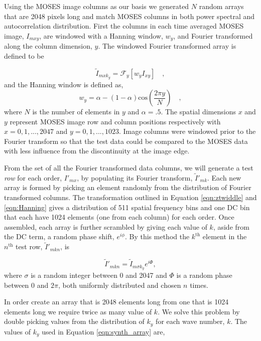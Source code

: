 		Using the MOSES image columns as our basis we generated $N$ random arrays that are 2048 pixels long and match MOSES columns in both power spectral and autocorrelation distribution.  
		First the columns in each time averaged MOSES image, $I_{mxy}$, are windowed with a Hanning window, $w_y$, and Fourier transformed along the column dimension, $y$.  
		The windowed Fourier transformed array is defined to be
	
		\begin{equation}
			\widetilde{I}_{mxk_y} = \mathcal{F}_y\left[ w_yI_{xy}\right]\quad, 
			\label{eqn:ztwiddle}
		\end{equation}
		and the Hanning window is defined as,	
		\begin{equation}
			w_y = \alpha - (1-\alpha)\mathrm{cos}\left( \frac{2\pi y}{N} \right)\quad ,
			\label{eqn:Hanning}
		\end{equation}
		where $N$ is the number of elements in $y$ and $\alpha = .5$.
   		The spatial dimensions $x$ and $y$ represent MOSES image row and column positions respectively with $ x = 0,1,...,2047$ and $y = 0,1,...,1023$.
   		Image columns were windowed prior to the Fourier transform so that the test data could be compared to the MOSES data with less influence from the discontinuity at the image edge.  
	
		From the set of all the Fourier transformed data columns, we will generate a test \emph{row} for each order, $I'_{mx}$, by populating its Fourier transform, $\widetilde{I}'_{mk}$. 
		Each new array is formed by picking an element randomly from the distribution of Fourier transformed columns. 
		The transformation outlined in Equation \ref{eqn:ztwiddle} and \ref{eqn:Hanning} gives a distribution of 511 spatial frequency bins and one DC bin that each have 1024 elements (one from each column) for each order. 
		Once assembled, each array is further scrambled by giving each value of $k$, aside from the DC term, a random phase shift, $e^{i\phi}$.  
		By this method the $k^{\mathrm{th}}$ element in the $n^\text{th}$ test row, $\widetilde{I}'_{mkn}$, is
	
		\begin{equation}
			\widetilde{I}'_{mkn} = \widetilde{I}_{m\sigma k_y}e^{i\Phi} ,
			\label{eqn:synth_array}
		\end{equation}
		where $\sigma$ is a random integer between 0 and 2047 and $\Phi$ is a random phase between 0 and $2\pi$, both uniformly distributed and chosen $n$ times.
		
		In order create an array that is 2048 elements long from one that is 1024 elements long we require twice as many value of $k$.  
		We solve this problem by double picking values from the distribution of $k_y$ for each wave number, $k$.  
		The values of $k_y$ used in Equation \ref{eqn:synth_array} are,
		
